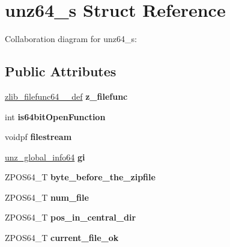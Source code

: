 \hypertarget{structunz64__s}{\section{unz64\+\_\+s Struct Reference}
\label{structunz64__s}
}


Collaboration diagram for unz64\+\_\+s\+:
\subsection*{Public Attributes}
\begin{DoxyCompactItemize}
\item 
\hypertarget{structunz64__s_a01d834fe3f5d52a7d2d760088ae0e76b}{\hyperlink{structzlib__filefunc64__32__def__s}{zlib\+\_\+filefunc64\+\_\+\_\+def} {\bfseries z\+\_\+filefunc}}\label{structunz64__s_a01d834fe3f5d52a7d2d760088ae0e76b}

\item 
\hypertarget{structunz64__s_a4fdb44d053423216223ce9ea7f415e84}{int {\bfseries is64bit\+Open\+Function}}\label{structunz64__s_a4fdb44d053423216223ce9ea7f415e84}

\item 
\hypertarget{structunz64__s_ae8f0d283404defa363a10cc367a795b1}{voidpf {\bfseries filestream}}\label{structunz64__s_ae8f0d283404defa363a10cc367a795b1}

\item 
\hypertarget{structunz64__s_a5ba3128f450a732ba83065b99f984d38}{\hyperlink{structunz__global__info64__s}{unz\+\_\+global\+\_\+info64} {\bfseries gi}}\label{structunz64__s_a5ba3128f450a732ba83065b99f984d38}

\item 
\hypertarget{structunz64__s_af898009d3afb95676c5f1d482fa71ed0}{Z\+P\+O\+S64\+\_\+\+T {\bfseries byte\+\_\+before\+\_\+the\+\_\+zipfile}}\label{structunz64__s_af898009d3afb95676c5f1d482fa71ed0}

\item 
\hypertarget{structunz64__s_ab269fbe15e5c11cb0b034281c29be611}{Z\+P\+O\+S64\+\_\+\+T {\bfseries num\+\_\+file}}\label{structunz64__s_ab269fbe15e5c11cb0b034281c29be611}

\item 
\hypertarget{structunz64__s_a304767ee88ee980f3eb44861cdb5d5a2}{Z\+P\+O\+S64\+\_\+\+T {\bfseries pos\+\_\+in\+\_\+central\+\_\+dir}}\label{structunz64__s_a304767ee88ee980f3eb44861cdb5d5a2}

\item 
\hypertarget{structunz64__s_a4c77cce6b700dcadf88a420ed0fa0565}{Z\+P\+O\+S64\+\_\+\+T {\bfseries current\+\_\+file\+\_\+ok}}\label{structunz64__s_a4c77cce6b700dcadf88a420ed0fa0565}


\end{DoxyCompactItemize}

